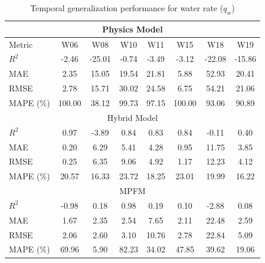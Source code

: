 \documentclass[12pt,APA]{uomthesis}
\begin{document}
\begin{table}[!ht]
\centering
\caption{Temporal generalization performance for water rate ($q_w$)}
\label{tab:temporal_water_rate_comparison}
\begin{tabular}{lccccccc}

\hline
\hline
\multicolumn{8}{c}{Physics Model} \\
\hline
Metric & W06 & W08 & W10 & W11 & W15 & W18 & W19 \\
\hline
$R^2$ & -2.46 & -25.01 & -0.74 & -3.49 & -3.12 & -22.08 & -15.86 \\
MAE & 2.35 & 15.05 & 19.54 & 21.81 & 5.88 & 52.93 & 20.41 \\
RMSE & 2.78 & 15.71 & 30.02 & 24.58 & 6.75 & 54.21 & 21.06 \\
MAPE (\%) & 100.00 & 38.12 & 99.73 & 97.15 & 100.00 & 93.06 & 90.89 \\
\hline

\multicolumn{8}{c}{Hybrid Model} \\
\hline
$R^2$ & 0.97 & -3.89 & 0.84 & 0.83 & 0.84 & -0.11 & 0.40 \\
MAE & 0.20 & 6.29 & 5.41 & 4.28 & 0.95 & 11.75 & 3.85 \\
RMSE & 0.25 & 6.35 & 9.06 & 4.92 & 1.17 & 12.23 & 4.12 \\
MAPE (\%) & 20.57 & 16.33 & 23.72 & 18.25 & 23.01 & 19.99 & 16.22 \\
\hline

\multicolumn{8}{c}{MPFM} \\
\hline
$R^2$ & -0.98 & 0.18 & 0.98 & 0.19 & 0.10 & -2.88 & 0.08 \\
MAE & 1.67 & 2.35 & 2.54 & 7.65 & 2.11 & 22.48 & 2.59 \\
RMSE & 2.06 & 2.60 & 3.10 & 10.76 & 2.78 & 22.84 & 5.09 \\
MAPE (\%) & 69.96 & 5.90 & 82.23 & 34.02 & 47.85 & 39.62 & 19.06 \\
\hline
\end{tabular}
\end{table}
\end{document}
